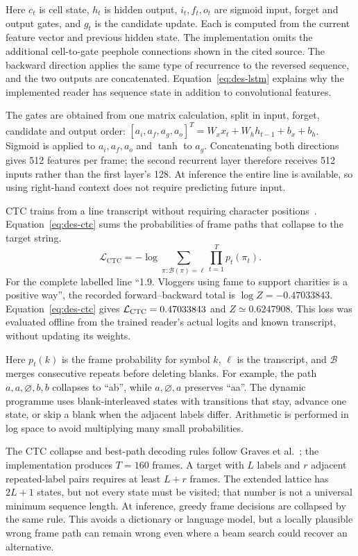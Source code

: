 Here $c_t$ is cell state, $h_t$ is hidden output, $i_t,f_t,o_t$ are sigmoid input, forget and output gates, and $g_t$ is the candidate update. Each is computed from the current feature vector and previous hidden state. The implementation omits the additional cell-to-gate peephole connections shown in the cited source. The backward direction applies the same type of recurrence to the reversed sequence, and the two outputs are concatenated. Equation~\ref{eq:des-lstm} explains why the implemented reader has sequence state in addition to convolutional features.

The gates are obtained from one matrix calculation, split in input, forget, candidate and output order: $[a_i,a_f,a_g,a_o]^T=W_xx_t+W_hh_{t-1}+b_x+b_h$. Sigmoid is applied to $a_i,a_f,a_o$ and $\tanh$ to $a_g$. Concatenating both directions gives 512 features per frame; the second recurrent layer therefore receives 512 inputs rather than the first layer's 128. At inference the entire line is available, so using right-hand context does not require predicting future input.

CTC trains from a line transcript without requiring character positions~\cite[pp.~2--3]{graves2006}. Equation~\ref{eq:des-ctc} sums the probabilities of frame paths that collapse to the target string.
\begin{equation}
\mathcal L_{\mathrm{CTC}}=-\log\sum_{\pi:\mathcal B(\pi)=\boldsymbol\ell}
\prod_{t=1}^{T}p_t(\pi_t).
\label{eq:des-ctc}
\end{equation}
For the complete labelled line ``1.9. Vloggers using fame to support charities is a positive way'', the recorded forward--backward total is $\log Z=-0.47033843$. Equation~\ref{eq:des-ctc} gives $\mathcal L_{\rm CTC}=0.47033843$ and $Z\simeq0.6247908$. This loss was evaluated offline from the trained reader's actual logits and known transcript, without updating its weights.

Here $p_t(k)$ is the frame probability for symbol $k$, $\boldsymbol\ell$ is the transcript, and $\mathcal B$ merges consecutive repeats before deleting blanks. For example, the path $a,a,\varnothing,b,b$ collapses to ``ab'', while $a,\varnothing,a$ preserves ``aa''. The dynamic programme uses blank-interleaved states with transitions that stay, advance one state, or skip a blank when the adjacent labels differ. Arithmetic is performed in log space to avoid multiplying many small probabilities.

The CTC collapse and best-path decoding rules follow Graves et al.~\cite[pp.~2--3]{graves2006}; the implementation produces $T=160$ frames. A target with $L$ labels and $r$ adjacent repeated-label pairs requires at least $L+r$ frames. The extended lattice has $2L+1$ states, but not every state must be visited; that number is not a universal minimum sequence length. At inference, greedy frame decisions are collapsed by the same rule. This avoids a dictionary or language model, but a locally plausible wrong frame path can remain wrong even where a beam search could recover an alternative.

